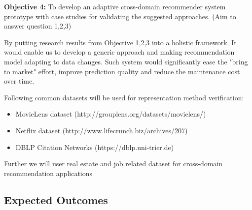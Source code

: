 \bigskip
\textbf{Objective 4:} To develop an adaptive cross-domain recommender system prototype with case studies for validating the suggested approaches. (Aim to answer question 1,2,3)

By putting research results from Objective 1,2,3 into a holistic framework. It would enable us to develop a generic approach and making recommendation model adapting to data changes. Such system would significantly ease the "bring to market" effort, improve prediction quality and reduce the maintenance cost over time. 

Following common datasets will be used for representation method verification: 

\begin{itemize}

\item MovieLens dataset (http://grouplens.org/datasets/movielens/) 

\item Netflix dataset (http://www.lifecrunch.biz/archives/207) 

\item DBLP Citation Networks (https://dblp.uni-trier.de)  

\end{itemize}

Further we will user real estate and job related dataset for cross-domain recommendation applications


\subsection*{Expected Outcomes}

